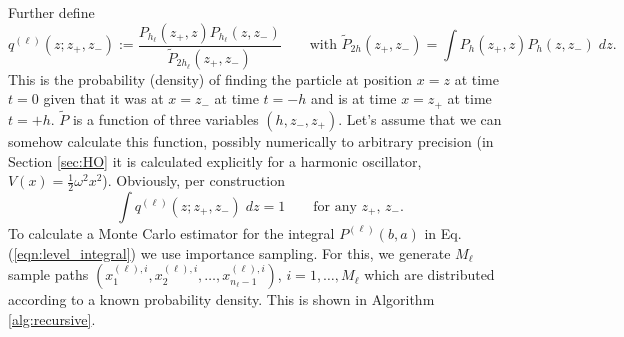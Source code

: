 \documentclass{article}
\begin{document}
Further define
\begin{equation}
q^{(\ell)}(z;z_+,z_-) := \frac{P_{h_\ell}(z_+,z)P_{h_\ell}(z,z_-)}{\tilde{P}_{2h_\ell}(z_+,z_-)}\qquad\text{with $\tilde{P}_{2h}(z_+,z_-)=\int P_{h}(z_+,z)P_{h}(z,z_-)\;dz$}.\label{eqn:tildeP}
\end{equation}
This is the probability (density) of finding the particle at position $x=z$ at time $t=0$ given that it was at $x=z_-$ at time $t=-h$ and is at time $x=z_+$ at time $t=+h$. $\tilde{P}$ is a function of three variables $(h,z_-,z_+)$. Let's assume that we can somehow calculate this function, possibly numerically to arbitrary precision (in Section \ref{sec:HO} it is calculated explicitly for a harmonic oscillator, $V(x)=\frac{1}{2}\omega^2x^2$). Obviously, per construction
\begin{equation}
\int q^{(\ell)}(z;z_+,z_-)\;dz=1\qquad\text{for any $z_+$, $z_-$}.
\end{equation}
To calculate a Monte Carlo estimator for the integral $P^{(\ell)}(b,a)$ in Eq. (\ref{eqn:level_integral}) we use importance sampling. For this, we generate $M_\ell$ sample paths $(x_1^{(\ell),i},x_2^{(\ell),i},\dots,x_{n_\ell-1}^{(\ell),i})$, $i=1,\dots,M_\ell$ which are distributed according to a known probability density. This is shown in Algorithm \ref{alg:recursive}.
\end{document}
